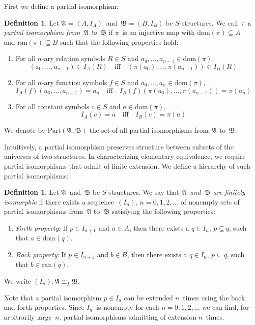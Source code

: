 \documentclass[letterpaper]{article}
\newcommand{\A}{\mathfrak{A}}
\newcommand{\B}{\mathfrak{B}}
\newcommand{\dom}{\mathrm{dom}}
\newcommand{\ran}{\mathrm{ran}}
\newcommand{\pisos}{\mathrm{Part}}
\newcommand{\iso}{\cong}
\newcommand{\fiso}{\iso_f}
\numberwithin{equation}{section}
\theoremstyle{plain}
\theoremstyle{definition}
\newtheorem{defn}[equation]{Definition}
\begin{document}
First we define a partial isomorphism:
\begin{defn}
Let $\A=(A,I_A)$~and~$\B=(B,I_B)$ be $S$-structures. We call~$\pi$ a \emph{partial isomorphism from~$\A$ to~$\B$} if $\pi$~is an injective map with $\dom(\pi)\subseteq A$ and $\ran(\pi)\subseteq B$ such that the following properties hold:
\begin{enumerate}[itemsep=0pt]
\item For all $n$-ary relation symbols $R\in S$ and $a_0,\ldots,a_{n-1}\in\dom(\pi)$,
$$(a_0,\ldots,a_{n-1})\in I_A(R)\quad\text{iff}\quad(\pi(a_0),\ldots,\pi(a_{n-1}))\in I_B(R)$$
\item For all $n$-ary function symbols $f\in S$ and $a_0,\ldots,a_n\in\dom(\pi)$,
$$I_A(f)(a_0,\ldots,a_{n-1})=a_n\quad\text{iff}\quad I_B(f)(\pi(a_0),\ldots,\pi(a_{n-1}))=\pi(a_n)$$
\item For all constant symbols $c\in S$ and $a\in\dom(\pi)$,
$$I_A(c)=a\quad\text{iff}\quad I_B(c)=\pi(a)$$
\end{enumerate}
We denote by $\pisos(\A,\B)$ the set of all partial isomorphisms from~$\A$ to~$\B$.
\end{defn}
\noindent Intuitively, a partial isomorphism preserves structure between subsets of the universes of two structures. In characterizing elementary equivalence, we require partial isomorphisms that admit of finite extension. We define a hierarchy of such partial isomorphisms:
\begin{defn}
Let $\A$~and~$\B$ be $S$-structures. We say that \emph{$\A$~and~$\B$ are finitely isomorphic} if there exists a sequence~$(I_n)$, $n=0,1,2,\ldots$ of nonempty sets of partial isomorphisms from~$\A$ to~$\B$ satisfying the following properties:
\begin{enumerate}[itemsep=0pt]
\item \emph{Forth property}: If $p\in I_{n+1}$ and $a\in A$, then there exists a $q\in I_n$, $p\subseteq q$, such that $a\in\dom(q)$.
\item \emph{Back property}: If $p\in I_{n+1}$ and $b\in B$, then there exists a $q\in I_n$, $p\subseteq q$, such that $b\in\ran(q)$.
\end{enumerate}
We write $(I_n):\A\fiso\B$.
\end{defn}
\noindent Note that a partial isomorphism $p\in I_n$ can be extended $n$~times using the back and forth properties. Since $I_n$~is nonempty for each $n=0,1,2,\ldots$ we can find, for arbitrarily large~$n$, partial isomorphisms admitting of extension $n$~times.
\end{document}
